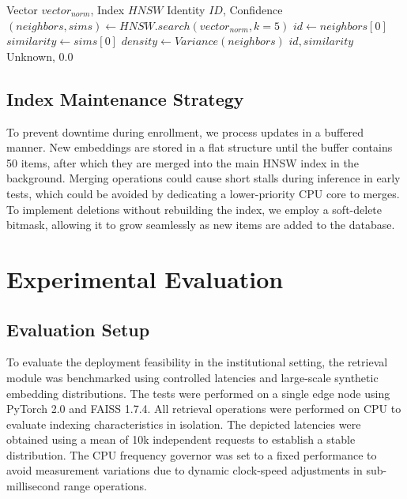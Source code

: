 \documentclass[conference]{IEEEtran}
\begin{document}
\begin{algorithm}[H]
\caption{High-Throughput Retrieval Logic}
\begin{algorithmic}[1]
\small
\Require Vector $vector_{norm}$, Index $HNSW$
\Ensure Identity $ID$, Confidence
\State $(neighbors, sims) \leftarrow HNSW.search(vector_{norm}, k=5)$
\State $id \leftarrow neighbors[0]$
\State $similarity \leftarrow sims[0]$
\State $density \leftarrow Variance(neighbors)$
    \State \Return $id, similarity$
\Else
    \State \Return Unknown, 0.0
\EndIf
\end{algorithmic}
\label{fig:algo}
\end{algorithm}

\subsection{Index Maintenance Strategy}
To prevent downtime during enrollment, we process updates in a buffered manner. New embeddings are stored in a flat structure until the buffer contains 50 items, after which they are merged into the main HNSW index in the background. Merging operations could cause short stalls during inference in early tests, which could be avoided by dedicating a lower-priority CPU core to merges. To implement deletions without rebuilding the index, we employ a soft-delete bitmask, allowing it to grow seamlessly as new items are added to the database.

\section{Experimental Evaluation}

\subsection{Evaluation Setup}
To evaluate the deployment feasibility in the institutional setting, the retrieval module was benchmarked using controlled latencies and large-scale synthetic embedding distributions. The tests were performed on a single edge node using PyTorch 2.0 and FAISS 1.7.4. All retrieval operations were performed on CPU to evaluate indexing characteristics in isolation. The depicted latencies were obtained using a mean of 10k independent requests to establish a stable distribution. The CPU frequency governor was set to a fixed performance to avoid measurement variations due to dynamic clock-speed adjustments in sub-millisecond range operations.
\end{document}
